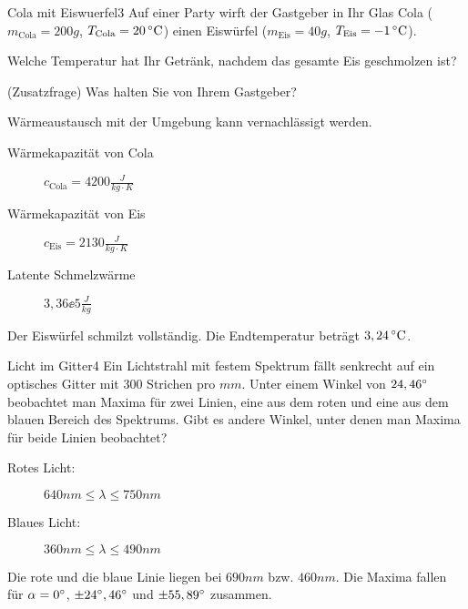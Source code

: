 
\begin{problem}{Cola mit Eiswuerfel}{3}
Auf einer Party wirft der Gastgeber in Ihr Glas Cola ($m_\mathrm{Cola} = 200\unit{g}$, $T_\mathrm{Cola} = 20\,\mathrm{^\circ C}$) einen Eiswürfel ($m_\mathrm{Eis} = 40\unit{g}$, $T_\mathrm{Eis} = -1\,\mathrm{^\circ C}$).
\begin{abcenum}
\item Welche Temperatur hat Ihr Getränk, nachdem das gesamte Eis geschmolzen ist?
\item (Zusatzfrage) Was halten Sie von Ihrem Gastgeber?
\end{abcenum}
Wärmeaustausch mit der Umgebung kann vernachlässigt werden.
\begin{description}
\item[Wärmekapazität von Cola] $c_{\mathrm{Cola}} = 4200\unit{\frac{J}{kg \cdot K}}$
\item[Wärmekapazität von Eis] $c_{\mathrm{Eis}} = 2130\unit{\frac{J}{kg \cdot K}}$
\item[Latente Schmelzwärme] $3,36\ee{5}\unit{\frac{J}{kg}}$
\end{description}

\begin{solution}
Der Eiswürfel schmilzt vollständig. Die Endtemperatur beträgt $3,24\,\mathrm{^\circ C}$.
\end{solution}
\end{problem}


\begin{problem}{Licht im Gitter}{4}
Ein Lichtstrahl mit festem Spektrum fällt senkrecht auf ein optisches Gitter mit $300$ Strichen pro $\unit{mm}$.
Unter einem Winkel von $24,46^\circ$ beobachtet man Maxima für zwei Linien, eine aus dem roten und eine aus dem blauen Bereich des Spektrums.
Gibt es andere Winkel, unter denen man Maxima für beide Linien beobachtet?
\begin{description}
\item[Rotes Licht:] $640\unit{nm}\leq\lambda\leq750\unit{nm}$
\item[Blaues Licht:] $360\unit{nm}\leq\lambda\leq490\unit{nm}$
\end{description}
\begin{solution}
Die rote und die blaue Linie liegen bei $690\unit{nm}$ bzw. $460\unit{nm}$.
Die Maxima fallen für $\alpha=0^\circ$, $\pm24^\circ,46^\circ$ und $\pm55,89^\circ$ zusammen.
\end{solution}
\end{problem}


